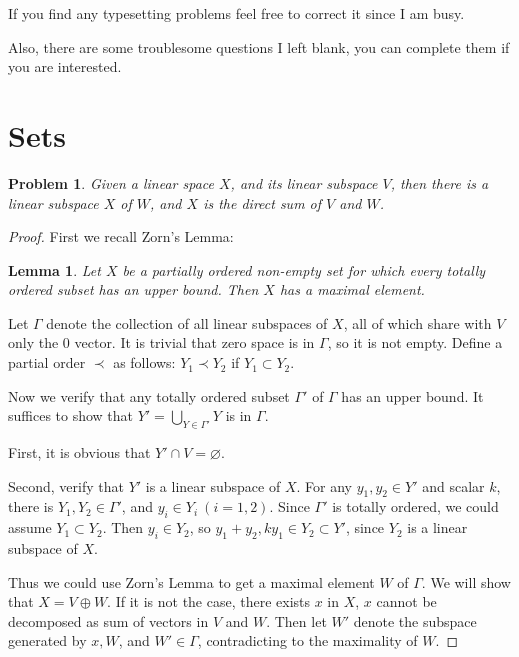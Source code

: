 \english
\theoremstyle{plain}\newtheorem{problem}{Problem}
\theoremstyle{plain}\newtheorem*{lemma*}{Lemma}
\renewcommand\thesection{\arabic {section}}
\nosectionnumbers

If you find any typesetting problems feel free to correct it since I am busy.

Also, there are some troublesome questions I left blank, you can complete them if you are interested.

\section*{Sets}

\begin{problem}
Given a linear space $ X $, and its linear subspace $ V $,
then there is a linear subspace $ X $ of $ W $,
and $ X $ is the direct sum of $ V $ and $ W $.
\end{problem}

\begin{proof}
	First we recall Zorn's Lemma:
	\begin{lemma*}
		Let $X$ be a partially ordered non-empty set for which
		every totally ordered subset has an upper bound.
		Then $X$ has a maximal element.
	\end{lemma*}
	Let  $ \Gamma $ denote the collection of all linear subspaces of $ X $,
	all of which share with $ V $ only the $ 0 $ vector.
	It is trivial that zero space is in $ \Gamma $, so it is not empty.
	Define a partial order $ \prec $ as follows:
	$ Y_{1} \prec Y_{2} $ if  $ Y_{1}\subset Y_{2} $.

	Now we verify that any totally ordered subset $ \Gamma' $ of  $ \Gamma $ has an upper bound.
	It suffices to show that $ Y'=\bigcup_{Y\in \Gamma'}Y $ is in $ \Gamma $.

	First, it is obvious that $ Y'\cap V=\varnothing $.

	Second, verify that $ Y' $ is a linear subspace of $ X $.
	For any $ y_{1},y_{2}\in Y'$ and scalar $ k $, there is $ Y_{1},Y_{2}\in \Gamma' $,
	and $ y_{i}\in Y_{i}\ (i=1,2) $. Since $ \Gamma' $ is totally ordered,
	we could assume $ Y_{1}\subset Y_{2} $. Then $ y_{i}\in Y_{2} $,
	so $ y_{1}+y_{2},ky_{1}\in Y_{2} \subset Y' $,
	since $ Y_{2} $ is a linear subspace of $ X $.

	Thus we could use Zorn's Lemma to get a maximal element $ W $ of $ \Gamma $.
	We will show that $ X=V\oplus W $.
	If it is not the case, there exists $ x $ in $ X $, $ x $ cannot be decomposed as sum of vectors in $ V $ and $ W $.
	Then let $ W' $ denote the subspace generated by $ x,W $, and $ W'\in \Gamma $, contradicting to the maximality of $ W $.
\end{proof}

